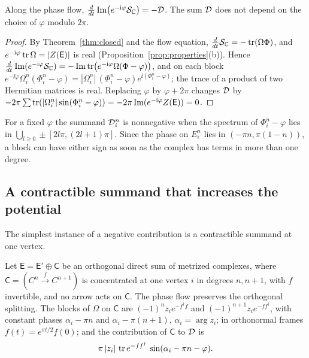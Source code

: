 \begin{proposition}\label{prop:rate}
Along the phase flow,
$\frac d{dt}\operatorname{Im}\bigl(e^{-\mathrm i\varphi}\mathcal S_{\mathbb C}\bigr)=-\mathcal D$. The sum $\mathcal D$ does not
depend on the choice of $\varphi$ modulo $2\pi$.
\end{proposition}

\begin{proof}
By Theorem~\ref{thm:closed} and the flow equation,
$\frac d{dt}\mathcal S_{\mathbb C}=-\operatorname{tr}(\Omega\Phi)$, and
$e^{-\mathrm i\varphi}\operatorname{tr}\Omega=|Z(\mathsf E)|$ is real
(Proposition~\ref{prop:properties}(b)). Hence
$\frac d{dt}\operatorname{Im}(e^{-\mathrm i\varphi}\mathcal S_{\mathbb C})
=-\operatorname{Im}\operatorname{tr}\bigl(e^{-\mathrm i\varphi}\Omega(\Phi-\varphi)\bigr)$, and on each block
$e^{-\ii\varphi}\Omega_i^n(\Phi_i^n-\varphi)
=|\Omega_i^n|\,(\Phi_i^n-\varphi)e^{\ii(\Phi_i^n-\varphi)}$; the trace of a
product of two Hermitian matrices is real. Replacing $\varphi$ by
$\varphi+2\pi$ changes $\mathcal D$ by
$-2\pi\sum\operatorname{tr}(|\Omega_i^n|\sin(\Phi_i^n-\varphi))=-2\pi\operatorname{Im}(e^{-\mathrm i\varphi}Z(\mathsf E))=0$.
\end{proof}

For a fixed $\varphi$ the summand $\mathcal D_i^n$ is nonnegative when the spectrum
of $\Phi_i^n-\varphi$ lies in $\bigcup_{l\geq0}\pm[2l\pi,(2l+1)\pi]$. Since the
phase on $E_i^n$ lies in $(-\pi n,\pi(1-n))$, a block can have either sign as
soon as the complex has terms in more than one degree.

\subsection{A contractible summand that increases the potential}
The simplest instance of a negative contribution is a contractible summand
at one vertex.

\begin{proposition}\label{prop:contractible}
Let $\mathsf E=\mathsf E'\oplus\mathsf C$ be an orthogonal direct sum of
metrized complexes, where $\mathsf C=(C^n\xrightarrow{f}C^{n+1})$ is
concentrated at one vertex $i$ in degrees $n,n+1$, with $f$ invertible, and no
arrow acts on $\mathsf C$. The phase flow preserves the orthogonal splitting. The
blocks of $\Omega$ on $\mathsf C$ are $(-1)^nz_ie^{-f^\dagger f}$ and
$(-1)^{n+1}z_ie^{-ff^\dagger}$, with constant phases $\alpha_i-\pi n$ and
$\alpha_i-\pi(n+1)$, $\alpha_i=\arg z_i$; in orthonormal frames
$f(t)=e^{\pi t/2}f(0)$; and the contribution of $\mathsf C$ to $\mathcal D$ is
\[
 \pi\,|z_i|\,\operatorname{tr} e^{-ff^\dagger}\,\sin(\alpha_i-\pi n-\varphi).
\]
\end{proposition}

